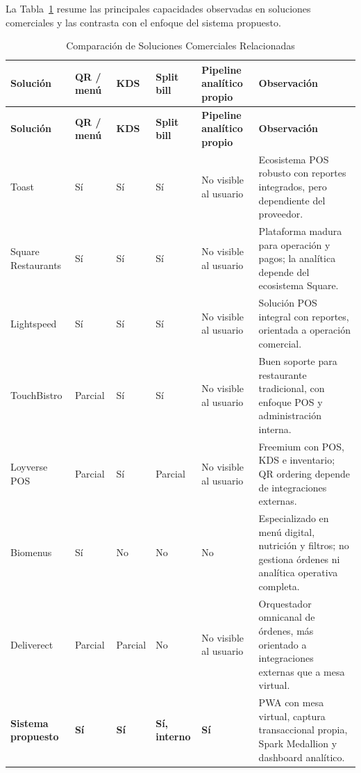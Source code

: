 La Tabla~\ref{tab:soluciones_comerciales} resume las principales capacidades observadas en
soluciones comerciales y las contrasta con el enfoque del sistema propuesto.

{\footnotesize
\setlength{\tabcolsep}{4pt}
\renewcommand{\arraystretch}{1.22}
\setlength{\LTleft}{0pt}
\setlength{\LTright}{0pt}
\begin{longtable}{>{\raggedright\arraybackslash}p{2.2cm}
                >{\centering\arraybackslash}p{1.45cm}
                >{\centering\arraybackslash}p{1.15cm}
                >{\centering\arraybackslash}p{1.55cm}
                >{\centering\arraybackslash}p{1.95cm}
                >{\raggedright\arraybackslash}p{4.45cm}}
\caption{Comparaci\'on de Soluciones Comerciales Relacionadas}
\label{tab:soluciones_comerciales}\\
\hline
\textbf{Soluci\'on} & \textbf{QR / men\'u} & \textbf{KDS} &
\textbf{Split bill} & \textbf{Pipeline anal\'itico propio} & \textbf{Observaci\'on} \\
\hline
\endfirsthead

\hline
\textbf{Soluci\'on} & \textbf{QR / men\'u} & \textbf{KDS} &
\textbf{Split bill} & \textbf{Pipeline anal\'itico propio} & \textbf{Observaci\'on} \\
\hline
\endhead

\hline
\endfoot

\hline
\endlastfoot

Toast & S\'i & S\'i & S\'i & No visible al usuario &
Ecosistema POS robusto con reportes integrados, pero dependiente del proveedor. \\
\rowcolor{altrow}
Square Restaurants & S\'i & S\'i & S\'i & No visible al usuario &
Plataforma madura para operaci\'on y pagos; la anal\'itica depende del ecosistema Square. \\
Lightspeed & S\'i & S\'i & S\'i & No visible al usuario &
Soluci\'on POS integral con reportes, orientada a operaci\'on comercial. \\
\rowcolor{altrow}
TouchBistro & Parcial & S\'i & S\'i & No visible al usuario &
Buen soporte para restaurante tradicional, con enfoque POS y administraci\'on interna. \\
Loyverse POS & Parcial & S\'i & Parcial & No visible al usuario &
Freemium con POS, KDS e inventario; QR ordering depende de integraciones externas. \\
\rowcolor{altrow}
Biomenus & S\'i & No & No & No &
Especializado en men\'u digital, nutrici\'on y filtros; no gestiona \'ordenes ni anal\'itica operativa completa. \\
Deliverect & Parcial & Parcial & No & No visible al usuario &
Orquestador omnicanal de \'ordenes, m\'as orientado a integraciones externas que a mesa virtual. \\
\rowcolor{black!6}
\textbf{Sistema propuesto} & \textbf{S\'i} & \textbf{S\'i} & \textbf{S\'i, interno} & \textbf{S\'i} &
PWA con mesa virtual, captura transaccional propia, Spark Medallion y dashboard anal\'itico. \\
\hline
\end{longtable}
}

